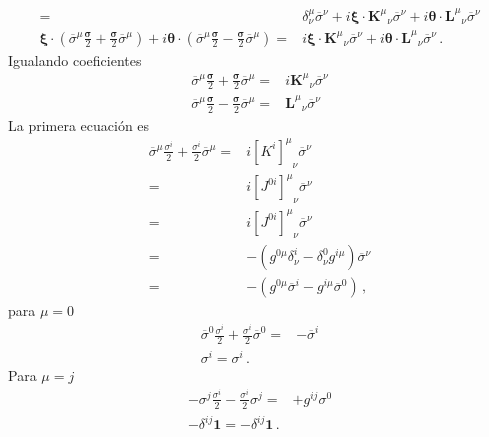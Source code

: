 \begin{frame}
\begin{align*}
 =&\delta^{\mu}_{\nu}\overline{\sigma}^\nu+i\boldsymbol{\xi}\cdot {\mathbf{K}^{\mu}}_{\nu}\overline{\sigma}^\nu+i\boldsymbol{\theta}\cdot {\mathbf{L}^{\mu}}_{\nu}\overline{\sigma}^\nu \nonumber\\
  \boldsymbol{\xi}\cdot \left(\overline{\sigma}^{\mu}\frac{\boldsymbol{\sigma}}{2}+ \frac{\boldsymbol{\sigma}}{2}\overline{\sigma}^{\mu}\right)  +i\boldsymbol{\theta}\cdot \left(\overline{\sigma}^{\mu} \frac{\boldsymbol{\sigma}}{2}-\frac{\boldsymbol{\sigma}}{2}\overline{\sigma}^{\mu} \right)  
 =&i\boldsymbol{\xi}\cdot {\mathbf{K}^{\mu}}_{\nu}\overline{\sigma}^\nu+i\boldsymbol{\theta}\cdot {\mathbf{L}^{\mu}}_{\nu}\overline{\sigma}^\nu\,.
\end{align*}
Igualando coeficientes
\begin{align*}
\overline{\sigma}^{\mu}\frac{\boldsymbol{\sigma}}{2}+ \frac{\boldsymbol{\sigma}}{2}\overline{\sigma}^{\mu}  =&i{\mathbf{K}^{\mu}}_{\nu}\overline{\sigma}^\nu \nonumber\\
\overline{\sigma}^{\mu} \frac{\boldsymbol{\sigma}}{2}-\frac{\boldsymbol{\sigma}}{2}\overline{\sigma}^{\mu}=&
{\mathbf{L}^{\mu}}_{\nu}\overline{\sigma}^\nu
\end{align*}
La primera ecuación es
\begin{align*}
  \overline{\sigma}^{\mu}\frac{\sigma^i}{2} +\frac{\sigma^i}{2}\overline{\sigma}^{\mu}  =&i{\left[ K^i \right]^{\mu}}_{\nu}\overline{\sigma}^\nu \nonumber\\
 =&i{\left[ J^{0i} \right]^{\mu}}_{\nu}\overline{\sigma}^\nu \nonumber\\
  =&i{\left[ J^{0i} \right]^{\mu}}_{\nu}\overline{\sigma}^\nu \nonumber\\
  =&-\left(g^{0\mu}\delta^i_{\nu} -\delta^0_{\nu}g^{i\mu}  \right)\overline{\sigma}^\nu \nonumber\\
  =&-\left(g^{0\mu}\overline{\sigma}^i -g^{i\mu} \overline{\sigma}^0  \right)\,,
\end{align*}
para $\mu=0$
\begin{align*}
  \overline{\sigma}^{0}\frac{\sigma^i}{2} +\frac{\sigma^i}{2}\overline{\sigma}^{0}=&-\overline{\sigma}^i \nonumber\\
  \sigma^i=\sigma^i\,.
\end{align*}
Para $\mu=j$
\begin{align*}
  -\sigma^{j}\frac{\sigma^i}{2} -\frac{\sigma^i}{2}\sigma^j  =& +g^{ij}\sigma^0\nonumber\\
  -\delta^{ij}\mathbf{1}=-\delta^{ij}\mathbf{1}\,.
\end{align*}

\end{frame}
